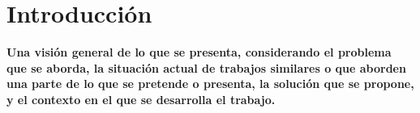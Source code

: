 \section{Introducción}\label{sc:Intro}

\textbf{Una visión general de lo que se presenta, considerando el problema que se aborda, la situación actual de trabajos similares o que aborden una parte de lo que se pretende o presenta, la solución que se propone, y el contexto en el que se desarrolla el trabajo.}


